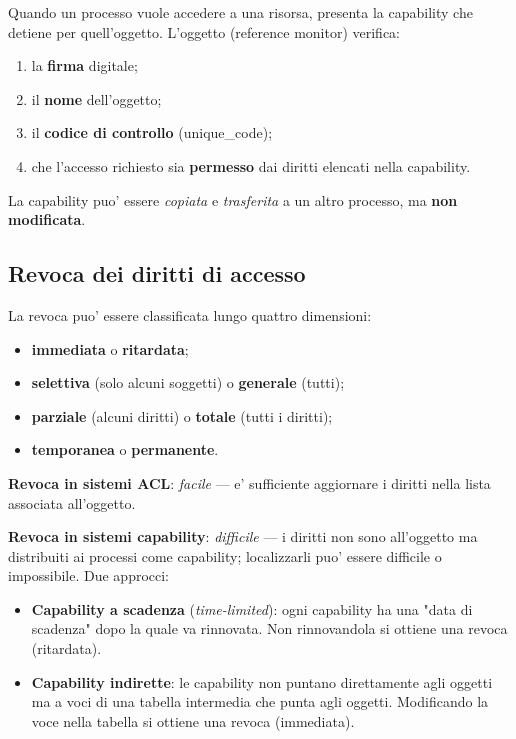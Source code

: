 Quando un processo vuole accedere a una risorsa, presenta la capability che detiene per quell'oggetto. L'oggetto (reference monitor) verifica:
\begin{enumerate}
  \item la \textbf{firma} digitale;
  \item il \textbf{nome} dell'oggetto;
  \item il \textbf{codice di controllo} (unique\_code);
  \item che l'accesso richiesto sia \textbf{permesso} dai diritti elencati nella capability.
\end{enumerate}
La capability puo' essere \textit{copiata} e \textit{trasferita} a un altro processo, ma \textbf{non modificata}.

\subsection{Revoca dei diritti di accesso}
La revoca puo' essere classificata lungo quattro dimensioni:
\begin{itemize}
  \item \textbf{immediata} o \textbf{ritardata};
  \item \textbf{selettiva} (solo alcuni soggetti) o \textbf{generale} (tutti);
  \item \textbf{parziale} (alcuni diritti) o \textbf{totale} (tutti i diritti);
  \item \textbf{temporanea} o \textbf{permanente}.
\end{itemize}

\textbf{Revoca in sistemi ACL}: \textit{facile} — e' sufficiente aggiornare i diritti nella lista associata all'oggetto.

\textbf{Revoca in sistemi capability}: \textit{difficile} — i diritti non sono all'oggetto ma distribuiti ai processi come capability; localizzarli puo' essere difficile o impossibile. Due approcci:
\begin{itemize}
  \item \textbf{Capability a scadenza} (\textit{time-limited}): ogni capability ha una "data di scadenza" dopo la quale va rinnovata. Non rinnovandola si ottiene una revoca (ritardata).
  \item \textbf{Capability indirette}: le capability non puntano direttamente agli oggetti ma a voci di una tabella intermedia che punta agli oggetti. Modificando la voce nella tabella si ottiene una revoca (immediata).
\end{itemize}

